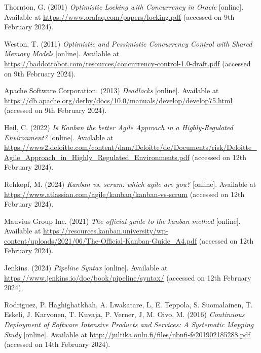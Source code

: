 \noindent Thornton, G. (2001) \textit{Optimistic Locking with Concurrency in Oracle} [online]. Available at \url{https://www.orafaq.com/papers/locking.pdf} (accessed on 9th February 2024).
\vspace{0.2cm}

\noindent Weston, T. (2011) \textit{Optimistic and Pessimistic Concurrency Control with Shared Memory Models} [online]. Available at \url{https://baddotrobot.com/resources/concurrency-control-1.0-draft.pdf} (accessed on 9th February 2024).
\vspace{0.2cm}

\noindent Apache Software Corporation. (2013) \textit{Deadlocks} [online]. Available at \url{https://db.apache.org/derby/docs/10.0/manuals/develop/develop75.html} (accessed on 9th February 2024).
\vspace{0.2cm}

\noindent Heil, C. (2022) \textit{Is Kanban the better Agile Approach in a Highly-Regulated Environment?} [online]. Available at \url{https://www2.deloitte.com/content/dam/Deloitte/de/Documents/risk/Deloitte_Agile_Approach_in_Highly_Regulated_Environments.pdf} (accessed on 12th February 2024).
\vspace{0.2cm}

\noindent Rehkopf, M. (2024) \textit{Kanban vs. scrum: which agile are you?} [online]. Available at \url{https://www.atlassian.com/agile/kanban/kanban-vs-scrum} (accessed on 12th February 2024).
\vspace{0.2cm}

\noindent Mauvius Group Inc. (2021) \textit{The official guide to the kanban method} [online]. Available at \url{https://resources.kanban.university/wp-content/uploads/2021/06/The-Official-Kanban-Guide_A4.pdf} (accessed on 12th February 2024).
\vspace{0.2cm}

\noindent Jenkins. (2024) \textit{Pipeline Syntax} [online]. Available at \url{https://www.jenkins.io/doc/book/pipeline/syntax/} (accessed on 12th February 2024).
\vspace{0.2cm}

\noindent Rodriguez, P. Haghighatkhah, A. Lwakatare, L, E. Teppola, S. Suomalainen, T. Eskeli, J. Karvonen, T. Kuvaja, P. Verner, J, M. Oivo, M. (2016) \textit{Continuous Deployment of Software Intensive Products and Services: A Systematic Mapping Study} [online]. Available at \url{http://jultika.oulu.fi/files/nbnfi-fe201902185288.pdf} (accessed on 14th February 2024).
\vspace{0.2cm}


